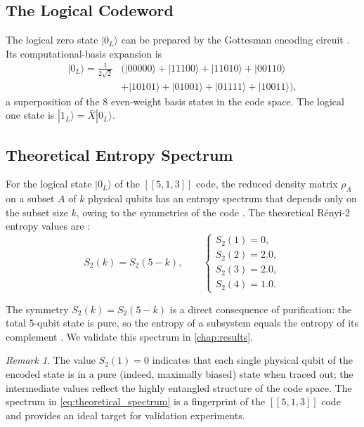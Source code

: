 \documentclass[12pt,a4paper,oneside]{book}
\theoremstyle{plain}
\theoremstyle{definition}
\theoremstyle{remark}
\newtheorem{remark}[theorem]{Remark}
\begin{document}
\subsection{The Logical Codeword}

The logical zero state $|0_L\rangle$ can be prepared by the Gottesman encoding circuit \cite{gottesman1997stabilizer}. Its computational-basis expansion is
\begin{align}
    |0_L\rangle = \tfrac{1}{2\sqrt{2}}&\bigl(|00000\rangle + |11100\rangle + |11010\rangle + |00110\rangle \nonumber\\
    &+ |10101\rangle + |01001\rangle + |01111\rangle + |10011\rangle\bigr),
\end{align}
a superposition of the 8 even-weight basis states in the code space. The logical one state is $|1_L\rangle = \bar{X}|0_L\rangle$.

\subsection{Theoretical Entropy Spectrum}

For the logical state $|0_L\rangle$ of the $[[5,1,3]]$ code, the reduced density matrix $\rho_A$ on a subset $A$ of $k$ physical qubits has an entropy spectrum that depends only on the subset size $k$, owing to the symmetries of the code \cite{laflamme1996perfect}. The theoretical R\'enyi-2 entropy values are \cite{obremski2017renyi, laflamme1996perfect}:
\begin{equation}
    \label{eq:theoretical_spectrum}
    S_2(k) = S_2(5-k), \qquad
    \begin{cases}
        S_2(1) = 0, \\
        S_2(2) = 2.0, \\
        S_2(3) = 2.0, \\
        S_2(4) = 1.0.
    \end{cases}
\end{equation}

The symmetry $S_2(k) = S_2(5-k)$ is a direct consequence of purification: the total 5-qubit state is pure, so the entropy of a subsystem equals the entropy of its complement \cite{horodecki2009quantum}. We validate this spectrum in \cref{chap:results}.

\begin{remark}
The value $S_2(1) = 0$ indicates that each single physical qubit of the encoded state is in a pure (indeed, maximally biased) state when traced out; the intermediate values reflect the highly entangled structure of the code space. The spectrum in \cref{eq:theoretical_spectrum} is a fingerprint of the $[[5,1,3]]$ code and provides an ideal target for validation experiments.
\end{remark}
\end{document}
